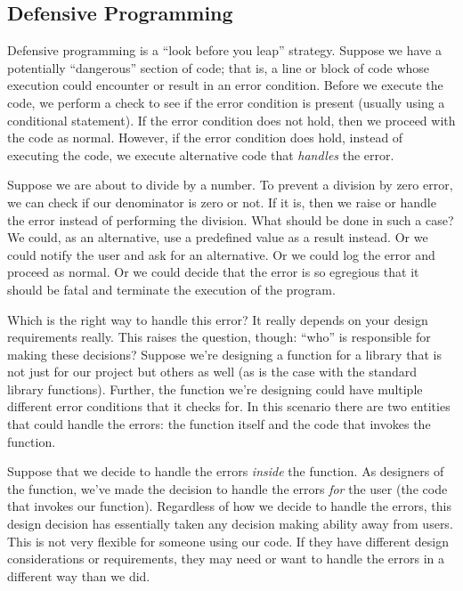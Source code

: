 \subsection{Defensive Programming}

Defensive programming is a ``look before you leap'' strategy.
Suppose we have a potentially ``dangerous'' section of code; 
that is, a line or block of code whose execution could encounter
or result in an error condition.  Before we execute the code, we perform
a check to see if the error condition is present (usually using
a conditional statement).  If the error condition does not hold, 
then we proceed with the code as normal.  However, if the
error condition does hold, instead of executing the code, we
execute alternative code that \emph{handles} the error.

Suppose we are about to divide by a number.
To prevent a division by zero error, we can check if our
denominator is zero or not.  If it is, then we raise or handle
the error instead of performing the division.  What should be 
done in such a case?  We could, as an 
alternative, use a predefined value as a result instead.  Or 
we could notify the user and ask for an alternative.  Or we
could log the error and proceed as normal.  Or we could 
decide that the error is so egregious that it should be fatal
and terminate the execution of the program.

Which is the right way to handle this error?  It really depends on 
your design requirements really.  This raises the question, 
though: ``who'' is responsible for making these decisions?
Suppose we're designing a function for a library that is 
not just for our project but others as well (as is the
case with the standard library functions).  Further, the
function we're designing could have multiple different 
error conditions that it checks for.  In this scenario there
are two entities that could handle the errors: the function
itself and the code that invokes the function.

Suppose that we decide to handle the errors \emph{inside} the 
function.  As designers of the function, we've made
the decision to handle the errors \emph{for} the user (the
code that invokes our function).  Regardless of how we
decide to handle the errors, this design decision has
essentially taken any decision making ability away from 
users.  This is not very flexible for someone using our 
code.  If they have different design considerations or
requirements, they may need or want to handle the errors
in a different way than we did.  

